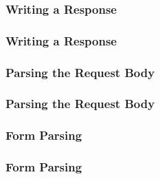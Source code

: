 \begin{frame}
  \frametitle{Writing a Response}
  
\end{frame}

\begin{frame}
  \frametitle{Writing a Response}
  
\end{frame}

\begin{frame}
  \frametitle{Parsing the Request Body}
  
\end{frame}

\begin{frame}
  \frametitle{Parsing the Request Body}
  
\end{frame}

\begin{frame}
\end{frame}

\begin{frame}
  \frametitle{Form Parsing}
  
\end{frame}

\begin{frame}
  \frametitle{Form Parsing}
  
\end{frame}

\begin{frame}
\end{frame}

